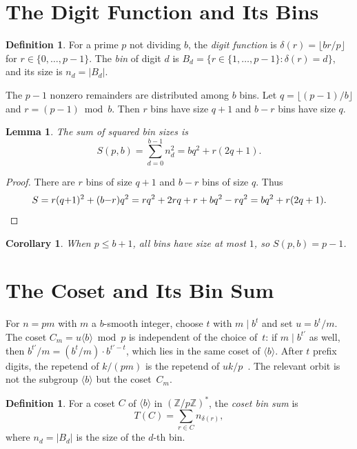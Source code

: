 \documentclass[12pt]{amsart}
\newtheorem{lemma}[theorem]{Lemma}
\newtheorem{corollary}[theorem]{Corollary}
\theoremstyle{definition}
\newtheorem{definition}[theorem]{Definition}
\theoremstyle{remark}
\begin{document}
\section{The Digit Function and Its Bins}

\begin{definition}
For a prime $p$ not dividing $b$, the \emph{digit function} is
$\delta(r) = \lfloor br/p \rfloor$ for $r \in \{0, \ldots, p{-}1\}$.
The \emph{bin} of digit $d$ is
$B_d = \{r \in \{1, \ldots, p{-}1\} : \delta(r) = d\}$, and its
size is $n_d = |B_d|$.
\end{definition}

The $p - 1$ nonzero remainders are distributed among $b$ bins. Let
$q = \lfloor (p{-}1)/b \rfloor$ and $r = (p{-}1) \bmod b$. Then $r$
bins have size $q + 1$ and $b - r$ bins have size $q$.

\begin{lemma}\label{lem:bin-sum}
The sum of squared bin sizes is
\[
S(p,b) = \sum_{d=0}^{b-1} n_d^2 = bq^2 + r(2q + 1).
\]
\end{lemma}

\begin{proof}
There are $r$ bins of size $q{+}1$ and $b{-}r$ bins of size $q$.
Thus
\[
S = r(q{+}1)^2 + (b{-}r)q^2 = rq^2 + 2rq + r + bq^2 - rq^2
  = bq^2 + r(2q + 1). \qedhere
\]
\end{proof}

\begin{corollary}\label{cor:dp-recovery}
When $p \le b + 1$, all bins have size at most $1$, so
$S(p,b) = p - 1$.
\end{corollary}

\section{The Coset and Its Bin Sum}

For $n = pm$ with $m$ a $b$-smooth integer, choose $t$
with $m \mid b^t$ and set $u = b^t / m$. The coset
$C_m = u \langle b \rangle \bmod p$ is independent of the
choice of~$t$: if $m \mid b^{t'}$ as well, then
$b^{t'}/m = (b^{t}/m) \cdot b^{t'-t}$, which lies in the
same coset of $\langle b \rangle$.
After $t$ prefix digits, the repetend of $k/(pm)$ is the
repetend of $uk/p$~\cite{paper2}. The relevant orbit is
not the subgroup $\langle b \rangle$ but the coset~$C_m$.

\begin{definition}
For a coset $C$ of $\langle b \rangle$ in
$(\mathbb{Z}/p\mathbb{Z})^{*}$, the \emph{coset bin sum}
is
\[
T(C) = \sum_{r \in C} n_{\delta(r)},
\]
where $n_d = |B_d|$ is the size of the $d$-th bin.
\end{definition}
\end{document}
